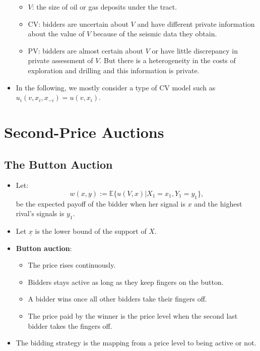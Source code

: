 \documentclass[]{book}
\providecommand{\tightlist}{%
  \setlength{\itemsep}{0pt}\setlength{\parskip}{0pt}}
\begin{document}
\begin{itemize}
  \begin{itemize}
  \tightlist
  \item
    \(V\): the size of oil or gas deposits under the tract.
  \item
    CV: bidders are uncertain about \(V\) and have different private
    information about the value of \(V\) because of the seismic data
    they obtain.
  \item
    PV: bidders are almost certain about \(V\) or have little
    discrepancy in private assessment of \(V\). But there is a
    heterogeneity in the costs of exploration and drilling and this
    information is private.
  \end{itemize}
\item
  In the following, we mostly consider a type of CV model such as
  \(u_i(v, x_i, x_{-i}) = u(v, x_i)\).
\end{itemize}

\section{Second-Price Auctions}\label{second-price-auctions}

\subsection{The Button Auction}\label{the-button-auction}

\begin{itemize}
\tightlist
\item
  Let: \[
  w(x, y) := \mathbb{E}\{u(V, x)|X_1 = x_1, Y_1 = y_1\},
  \] be the expected payoff of the bidder when her signal is \(x\) and
  the highest rival's signals is \(y_1\).
\item
  Let \(\underline{x}\) is the lower bound of the support of \(X\).
\item
  \textbf{Button auction}:

  \begin{itemize}
  \tightlist
  \item
    The price rises continuously.
  \item
    Bidders stays active as long as they keep fingers on the button.
  \item
    A bidder wins once all other bidders take their fingers off.
  \item
    The price paid by the winner is the price level when the second last
    bidder takes the fingers off.
  \end{itemize}
\item
  The bidding strategy is the mapping from a price level to being active
  or not.
\end{itemize}
\end{document}
